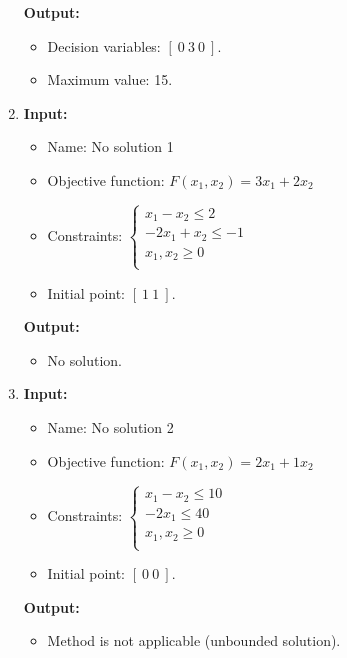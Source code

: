 \documentclass{article}
\begin{document}
\begin{enumerate}[label={(\arabic*)}, itemsep=0.25in]
          \textbf{Output:}
          \begin{itemize}
              \item Decision variables: \([ \ 0 \ 3 \ 0 \ ]\).
              \item Maximum value: 15.
          \end{itemize}

    \item \textbf{Input:}
          \begin{itemize}
              \item Name: No solution 1
              \item Objective function: \(F(x_1, x_2) = 3 x_1 + 2 x_2\)
              \item Constraints: \(\begin{cases}
                        x_1 - x_2 \le 2     \\
                        -2 x_1 + x_2 \le -1 \\
                        x_1, x_2 \ge 0      \\
                    \end{cases}\)
              \item Initial point: \([ \ 1 \ 1 \ ]\).
          \end{itemize}

          \textbf{Output:}
          \begin{itemize}
              \item No solution.
          \end{itemize}

    \item \textbf{Input:}
          \begin{itemize}
              \item Name: No solution 2
              \item Objective function: \(F(x_1, x_2) = 2 x_1 + 1 x_2\)
              \item Constraints: \(\begin{cases}
                        x_1 - x_2 \le 10 \\
                        -2 x_1 \le 40    \\
                        x_1, x_2 \ge 0   \\
                    \end{cases}\)
              \item Initial point: \([ \ 0 \ 0 \ ]\).
          \end{itemize}

          \textbf{Output:}
          \begin{itemize}
              \item Method is not applicable (unbounded solution).
          \end{itemize}
\end{enumerate}
\end{document}
